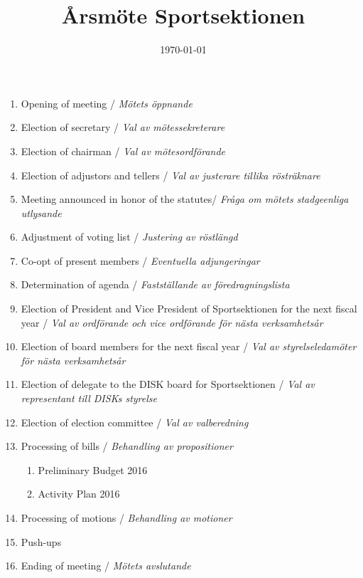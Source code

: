 \documentclass[12pt,a4paper]{article}
\begin{document}
	\title{\Huge Årsmöte Sportsektionen}
	\date{\today}
	\maketitle

	\null
	\vfill

	\clearpage

	\begin{enumerate}

		\item Opening of meeting / \emph{Mötets öppnande}
		\item Election of secretary / \emph{Val av mötessekreterare}
		\item Election of chairman / \emph{Val av mötesordförande}
		\item Election of adjustors and tellers / \emph{Val av justerare tillika rösträknare}
		\item Meeting announced in honor of the statutes/ \emph{Fråga om mötets stadgeenliga utlysande}
		\item Adjustment of voting list / \emph{Justering av röstlängd}
		\item Co-opt of present members / \emph{Eventuella adjungeringar}
		\item Determination of agenda / \emph{Fastställande av föredragningslista}

		\item Election of President and Vice President of Sportsektionen for the next fiscal year / \emph{Val av ordförande och vice ordförande för nästa verksamhetsår}
		\item Election of board members for the next fiscal year / \emph{Val av styrelseledamöter för nästa verksamhetsår}
		\item Election of delegate to the DISK board for Sportsektionen / \emph{Val av representant till DISKs styrelse}
		\item Election of election committee / \emph{Val av valberedning}
		\item Processing of bills / \emph{Behandling av propositioner}
			\begin{enumerate}
				\item Preliminary Budget 2016
				\item Activity Plan 2016
			\end{enumerate}
		\item Processing of motions / \emph{Behandling av motioner}

		\item Push-ups
		\item Ending of meeting / \emph{Mötets avslutande}
	\end{enumerate}
\end{document}
